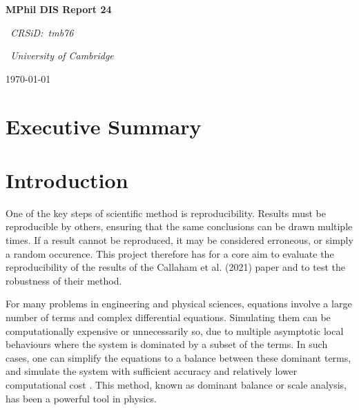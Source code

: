 \documentclass[12pt]{report} %
\begin{document}
\begin{titlepage}
  \centering
  \vspace*{2cm}
  {\LARGE\bfseries MPhil DIS Report 24\par}
  \vspace{1cm}
  {\Large\itshape\ CRSiD:\ tmb76\par}
  \vspace{1cm}
  {\Large\itshape\ University of Cambridge\par}
  \vfill
  {\large\today\par}
\end{titlepage}

\tableofcontents

\chapter{Executive Summary}


\chapter{Introduction}


One of the key steps of scientific method is reproducibility. Results must be reproducible by others, ensuring that the same conclusions can be drawn multiple times. If a result cannot be reproduced, it may be considered erroneous, or simply a random occurence. This project therefore has for a core aim to evaluate the reproducibility of the results of the Callaham et al. (2021)\cite{callaham2021learning} paper and to test the robustness of their method.

\vspace{5mm}

For many problems in engineering and physical sciences, equations involve a large number of terms and complex differential equations. Simulating them can be computationally expensive or unnecessarily so, due to multiple asymptotic local behaviours where the system is dominated by a subset of the terms. In such cases, one can simplify the equations to a balance between these dominant terms, and simulate the system with sufficient accuracy and relatively lower computational cost \cite{charney1990scale}. This method, known as dominant balance or scale analysis, has been a powerful tool in physics.

\vspace{5mm}
\end{document}
